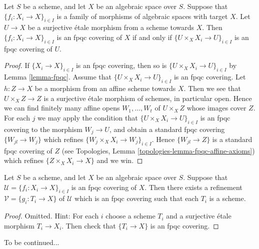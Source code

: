 \begin{lemma}
\label{lemma-recognize-fpqc-covering}
Let $S$ be a scheme, and let $X$ be an algebraic space over $S$.
Suppose that $\{f_i : X_i \to X\}_{i \in I}$ is a family of morphisms of
algebraic spaces with target $X$. Let $U \to X$ be a surjective
\'etale morphism from a scheme towards $X$. Then
$\{f_i : X_i \to X\}_{i \in I}$ is an fpqc covering of $X$ if and only
if $\{U \times_X X_i \to U\}_{i \in I}$ is an fpqc covering of $U$.
\end{lemma}

\begin{proof}
If $\{X_i \to X\}_{i \in I}$ is an fpqc covering, then so is
$\{U \times_X X_i \to U\}_{i \in I}$ by Lemma \ref{lemma-fpqc}.
Assume that $\{U \times_X X_i \to U\}_{i \in I}$ is an fpqc covering.
Let $h : Z \to X$ be a morphism from an affine scheme towards $X$.
Then we see that $U \times_X Z \to Z$ is a surjective \'etale morphism
of schemes, in particular open. Hence we can find finitely many affine opens
$W_1, \ldots, W_t$ of $U \times_X Z$ whose images cover $Z$.
For each $j$ we may apply the condition that
$\{U \times_X X_i \to U\}_{i \in I}$ is an fpqc covering
to the morphism $W_j \to U$, and obtain a standard fpqc covering
$\{W_{jl} \to W_j\}$ which refines $\{W_j \times_X X_i \to W_j\}_{i \in I}$.
Hence $\{W_{jl} \to Z\}$ is a standard fpqc covering of $Z$
(see
Topologies, Lemma \ref{topologies-lemma-fpqc-affine-axioms})
which refines $\{Z \times_X X_i \to X\}$ and we win.
\end{proof}

\begin{lemma}
\label{lemma-refine-fpqc-schemes}
Let $S$ be a scheme, and let $X$ be an algebraic space over $S$.
Suppose that $\mathcal{U} = \{f_i : X_i \to X\}_{i \in I}$ is an
fpqc covering of $X$. Then there exists a refinement
$\mathcal{V} = \{g_i : T_i \to X\}$ of $\mathcal{U}$ which is an
fpqc covering such that each $T_i$ is a scheme.
\end{lemma}

\begin{proof}
Omitted. Hint: For each $i$ choose a scheme $T_i$ and a surjective \'etale
morphism $T_i \to X_i$. Then check that $\{T_i \to X\}$ is an fpqc covering.
\end{proof}

\noindent
To be continued...












